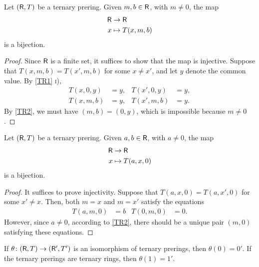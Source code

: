 \begin{lem}\label{lem:left-solution-of-sum}
    Let\/ $(\mathsf R,T)$ be a ternary prering. Given\/ $m,b\in\mathsf R$, with\/ $m\ne0$, the map
    \begin{align*}
        \mathsf R&\to\mathsf R\\
        x&\mapsto T(x,m,b)
    \end{align*}
    is a bijection.
\end{lem}

\begin{proof}
    Since $\mathsf R$ is a finite set, it suffices to show that the map is injective. Suppose that $T(x,m,b)=T(x',m,b)$ for some $x\ne x'$, and let $y$ denote the common value. By \ref{TR1} \textsc i),
    \begin{align*}
        T(x,0,y) &= y, &T(x',0,y) &= y,\\
        T(x,m,b) &= y, &T(x',m,b) &= y.
    \end{align*}
    By \ref{TR2}, we must have $(m,b)=(0,y)$, which is impossible because $m\ne0$.
\end{proof}

\begin{lem}\label{lem:right-solution-of-product}
    Let\/ $(\mathsf R,T)$ be a ternary prering. Given $a,b\in\mathsf R$, with $a\ne0$, the map
    \begin{align*}
        \mathsf R&\to\mathsf R\\
        x&\mapsto T(a,x,0)
    \end{align*}
    is a bijection.
\end{lem}

\begin{proof}
    It suffices to prove injectivity. Suppose that $T(a,x,0)=T(a,x',0)$ for some $x'\ne x$. Then, both $m=x$ and $m=x'$ satisfy the equations
    \begin{align*}
        T(a,m,0)&=b &T(0,m,0)&=0.
    \end{align*}
    However, since $a\ne0$, according to \ref{TR2}, there should be a unique pair $(m,0)$ satisfying these equations.
\end{proof}

\begin{lem}\label{lem:ternary-isomorphisms-preserve-units}
    If\/ $\theta\colon(\mathsf R,T)\to(\mathsf R',T')$ is an isomorphism of ternary prerings, then\/ $\theta(0)=0'$. If the ternary prerings are ternary rings, then\/ $\theta(1)=1'$.
\end{lem}

